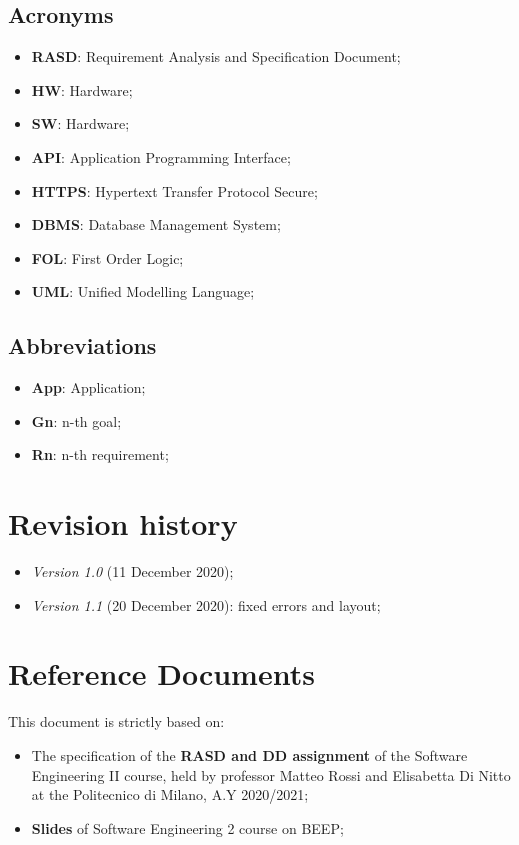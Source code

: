 \subsection{Acronyms}
\begin{itemize}
\item \textbf{RASD}: Requirement Analysis and Specification Document;
\item \textbf{HW}: Hardware;
\item \textbf{SW}: Hardware;
\item \textbf{API}: Application Programming Interface;
\item \textbf{HTTPS}: Hypertext Transfer Protocol Secure;
\item \textbf{DBMS}: Database Management System;
\item \textbf{FOL}: First Order Logic;
\item \textbf{UML}: Unified Modelling Language;
\end{itemize}
\medskip
\subsection{Abbreviations}
\begin{itemize}
\item \textbf{App}: Application;
\item \textbf{Gn}: n-th goal;
\item \textbf{Rn}: n-th requirement;
\end{itemize}



\section{Revision history}
\begin{itemize}
\item \textit{Version 1.0} (11 December 2020);
\item \textit{Version 1.1} (20 December 2020): fixed errors and layout; 
\end{itemize}

\pagebreak
\section{Reference Documents}
This document is strictly based on:
\begin{itemize}
\item The specification of the \textbf{RASD and DD assignment} of the Software Engineering II course, held by professor Matteo Rossi and Elisabetta Di Nitto at the Politecnico di Milano, A.Y 2020/2021;
\item \textbf{Slides} of Software Engineering 2 course on BEEP;
\end{itemize}
